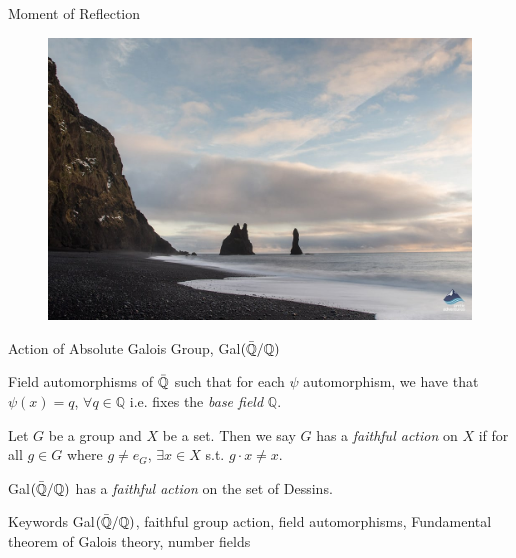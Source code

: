 \documentclass{beamer}
\newcommand{\QQ}{\mathbb{Q}}
\begin{document}
\begin{frame}{Moment of Reflection}
    \begin{figure}
        \centering
        \includegraphics[scale=0.3]{images_talk/moment_of_reflection.jpg}
    \end{figure}
\end{frame}


\begin{frame}{Action of Absolute Galois Group, Gal$(\Bar{\QQ} / \QQ)$}
    \begin{definition}[Gal$(\Bar{\QQ} / \QQ)$]
        Field automorphisms of $\Bar{\QQ}$ such that for each $\psi$ automorphism, we have that $\psi(x) = q$, $\forall q \in \QQ$ i.e. fixes the \emph{base field} $\QQ$.
    \end{definition}

    \begin{definition}
        Let $G$ be a group and $X$ be a set. Then we say $G$ has a \emph{faithful action} on $X$ if for all $g \in G$ where $g \ne e_G$, $\exists x \in X$ s.t. $g \cdot x \ne x$.
    \end{definition}

    \begin{theorem}
        Gal$(\Bar{\QQ} / \QQ)$ has a \emph{faithful action} on the set of Dessins. 
    \end{theorem}

    \vfill
    \begin{block}{\tiny{Keywords}}
    \tiny{Gal$(\Bar{\QQ} / \QQ)$, faithful group action, field automorphisms, Fundamental theorem of Galois theory, number fields}
    \end{block}
\end{frame}
\end{document}
